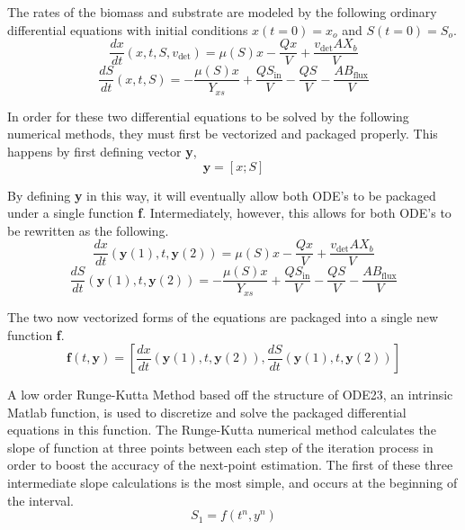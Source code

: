 \documentclass[letterpaper, twoside]{article}
\numberwithin{equation}{section}
\begin{document}
The rates of the biomass and substrate are modeled by the following ordinary differential equations with initial conditions $x(t=0)=x_o$ and $S(t=0)=S_o$.
\begin{equation} \label{eq: BiomassEquation}
  \frac{dx}{dt}(x,t,S,v_\mathrm{det}) = \mu(S) x - \frac{Q x}{V} + \frac{ v_{\mathrm{det}} A X_b}{V}
\end{equation}
\begin{equation} \label{eq: SubstrateEquation}
  \frac{dS}{dt}(x,t,S) = -\frac{\mu(S) x}{Y_{xs}} + \frac{Q S_{\mathrm{in}}}{V} - \frac{Q S}{V} - \frac{A B_{\mathrm{flux}}}{V}
\end{equation}

In order for these two differential equations to be solved by the following numerical methods, they must first be vectorized and packaged properly. This happens by first defining vector \textbf{y},
\begin{equation}
  \textbf{y} = [x;  S]
\end{equation}

By defining \textbf{y} in this way, it will eventually allow both ODE's to be packaged under a single function \textbf{f}. Intermediately, however, this allows for both ODE's to be rewritten as the following.
\begin{equation} \label{eq: BiomassEquationVectorized}
  \frac{dx}{dt}(\textbf{y}(1),t,\textbf{y}(2)) = \mu(S) x - \frac{Q x}{V} + \frac{ v_{\mathrm{det}} A X_b}{V}
\end{equation}
\begin{equation} \label{eq: SubstrateEquationVectorized}
  \frac{dS}{dt}(\textbf{y}(1),t,\textbf{y}(2)) = -\frac{\mu(S) x}{Y_{xs}} + \frac{Q S_{\mathrm{in}}}{V} - \frac{Q S}{V} - \frac{A B_{\mathrm{flux}}}{V}
\end{equation}

The two now vectorized forms of the equations are packaged into a single new function \textbf{f}.
\begin{equation} \label{eq: ODEpackagef}
  \textbf{f}(t,\textbf{y}) = \left[\frac{dx}{dt}\left(\textbf{y}(1),t,\textbf{y}(2)\right) , 
	      \frac{dS}{dt}\left(\textbf{y}(1),t,\textbf{y}(2)\right)\right]
\end{equation}

A low order Runge-Kutta Method based off the structure of ODE23, an intrinsic Matlab function, is used to discretize and solve the packaged differential equations in this function. The Runge-Kutta numerical method calculates the slope of function at three points between each step of the iteration process in order to boost the accuracy of the next-point estimation. The first of these three intermediate slope calculations is the most simple, and occurs at the beginning of the interval.
\begin{equation} \label{eq: S_1}
  S_1 = f(t^n,y^n)
\end{equation}
\end{document}

